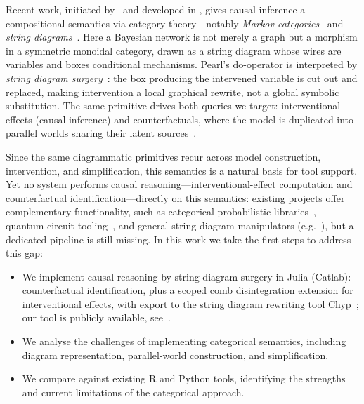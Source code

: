 \documentclass[runningheads]{llncs}
\begin{document}
Recent work, initiated by~\cite{jacobs2019causal} and developed in \cite{jacobs2021causal,lorenz2023causal,tull2023activeinference,friend2025compositional}, gives causal inference a compositional semantics via category theory---notably \emph{Markov categories}~\cite{fritz2020synthetic,jacobs2015} and \emph{string diagrams}~\cite{intro_to_string_diagram}. Here a Bayesian network is not merely a graph but a morphism in a symmetric monoidal category, drawn as a string diagram whose wires are variables and boxes conditional mechanisms. Pearl's $\mathrm{do}$-operator is interpreted by \emph{string diagram surgery}~\cite{jacobs2019causal}: the box producing the intervened variable is cut out and replaced, making intervention a local graphical rewrite, not a global symbolic substitution. The same primitive drives both queries we target: interventional effects (causal inference) and counterfactuals, where the model is duplicated into parallel worlds sharing their latent sources~\cite{jacobs2021causal}. 

Since the same diagrammatic primitives recur across model construction, intervention, and simplification, this semantics is a natural basis for tool support. Yet no system performs causal reasoning---interventional-effect computation and counterfactual identification---directly on this semantics: existing projects offer complementary functionality, such as categorical probabilistic libraries~\cite{cho2017efprob}, quantum-circuit tooling~\cite{kissinger2024pqs}, and general string diagram manipulators (e.g.~\cite{caldwell2026tensorrocq,chyp2024}), but a dedicated pipeline is still missing. In this work we take the first steps to address this gap:
\begingroup
\setlength{\leftmargini}{1.2em}
\begin{itemize}\setlength{\itemsep}{2pt}
    \item We implement causal reasoning by string diagram surgery in Julia (Catlab): counterfactual identification, plus a scoped comb disintegration extension for interventional effects, with export to the string diagram rewriting tool Chyp~\cite{chyp2024}; our tool is publicly available, see~\cite{idcf_tool}.
    \item We analyse the challenges of implementing categorical semantics, including diagram representation, parallel-world construction, and simplification.
    \item We compare against existing R and Python tools, identifying the strengths and current limitations of the categorical approach.
\end{itemize}
\endgroup
\end{document}
